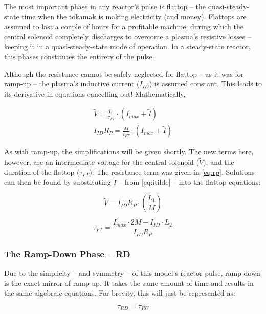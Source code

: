 The most important phase in any reactor's pulse is flattop -- the quasi-steady-state time when the tokamak is making electricity (and money). Flattops are assumed to last a couple of hours for a profitable machine, during which the central solenoid completely discharges to overcome a plasma's resistive losses -- keeping it in a quasi-steady-state mode of operation. In a steady-state reactor, this phases constitutes the entirety of the pulse.

Although the resistance cannot be safely neglected for flattop -- as it was for ramp-up -- the plasma's inductive current ($I_{ID}$) is assumed constant. This leads to its derivative in equations cancelling out! Mathematically,

\begin{align}
	\tilde V = \frac{L_1}{\tau_{FT}} \cdot \left( I_{max} + \tilde I \right) \\
	I_{ID} R_P = \frac{M}{\tau_{FT}} \cdot \left( I_{max} + \tilde I \right)
\end{align}

As with ramp-up, the simplifications will be given shortly. The new terms here, however, are an intermediate voltage for the central solenoid ($\tilde V$), and the duration of the flattop ($\tau_{FT}$). The resistance term was given in \cref{eq:rp}. Solutions can then be found by substituting $\tilde I$ -- from \cref{eq:itilde} -- into the flattop equations:

\begin{equation}
	\tilde V = I_{ID} R_P \cdot \left( \frac{L_1}{M} \right)	
\end{equation}

\begin{equation}
	\label{eq:tauft}
	\tau_{FT} = \frac{ I_{max} \cdot 2 M - I_{ID} \cdot  L_2 }{I_{ID} R_P}
\end{equation}

\subsubsection{The Ramp-Down Phase -- RD}

Due to the simplicity -- and symmetry -- of this model's reactor pulse, ramp-down is the exact mirror of ramp-up. It takes the same amount of time and results in the same algebraic equations. For brevity, this will just be represented as:

\begin{equation}
	\label{eq:taurd}
	\tau_{RD} = \tau_{RU}
\end{equation}

